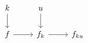\[
    \begin{tikzcd}
        k \arrow[d] & u \arrow[d] \\ 
        f \arrow[r] & f_k \arrow[r] & f_{ku}
    \end{tikzcd}
\]